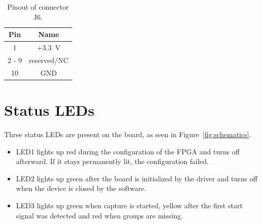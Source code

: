     \begin{table}
    \begin{small}
        \begin{center}
            \begin{tabular}{|c|c|}
                \hline
                Pin & Name\\
                \hline\hline
                1 & +\SI{3.3}{\volt}\\
                \hline
                2 - 9 & reserved/NC\\
                \hline
                10 & GND\\
                \hline
            \end{tabular}
            \caption{Pinout of connector J6.}
            \label{J6}
        \end{center}
    \end{small}
    \end{table}

\section{Status LEDs}
Three status LEDs are present on the board, as seen in 
Figure~\ref{fig:schematics}.
\begin{itemize}
    \item LED1 lights up red during the configuration of the FPGA
        and turns off afterward. If it stays permanently lit, the
        configuration failed.
    \item LED2 lights up green after the board is initialized by the
        driver and turns off when the device is closed by the
        software.
    \item LED3 lights up green when capture is started, yellow after
        the first start signal was detected and red when groups are
        missing.
\end{itemize}


